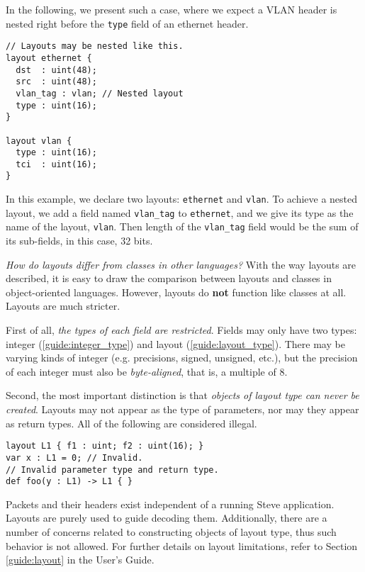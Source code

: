 In the following, we present such a case, where we expect a VLAN header
\cite{vlan_std} is nested right before the \texttt{type} field of an ethernet
header.

\begin{codepage}
\begin{lstlisting}
// Layouts may be nested like this.
layout ethernet {
  dst  : uint(48);
  src  : uint(48);
  vlan_tag : vlan; // Nested layout
  type : uint(16);
}

layout vlan {
  type : uint(16);
  tci  : uint(16);
}
\end{lstlisting}
\end{codepage}

In this example, we declare two layouts: \texttt{ethernet} and \texttt{vlan}. To
achieve a nested layout, we add a field named \texttt{vlan\_tag} to
\texttt{ethernet}, and we give its type as the name of the layout,
\texttt{vlan}. Then length of the \texttt{vlan\_tag} field would be the sum of
its sub-fields, in this case, 32 bits.

\textit{How do layouts differ from classes in other languages?} With the way
layouts are described, it is easy to draw the comparison between layouts and
classes in object-oriented languages. However, layouts do \textbf{not} function
like classes at all. Layouts are much stricter.

First of all, \textit{the types of each field are restricted}. Fields may only
have two types: integer (\ref{guide:integer_type}) and layout
(\ref{guide:layout_type}). There may be varying kinds of integer (e.g.
precisions, signed, unsigned, etc.), but the precision of each integer must also
be \textit{byte-aligned}, that is, a multiple of 8.

Second, the most important distinction is that \textit{objects of layout type
can never be created}. Layouts may not appear as the type of parameters, nor may
they appear as return types. All of the following are considered illegal.

\begin{codepage}
\begin{lstlisting}
layout L1 { f1 : uint; f2 : uint(16); }
var x : L1 = 0; // Invalid.
// Invalid parameter type and return type.
def foo(y : L1) -> L1 { }
\end{lstlisting}
\end{codepage}

Packets and their headers exist independent of a running Steve application.
Layouts are purely used to guide decoding them. Additionally, there are a number
of concerns related to constructing objects of layout type, thus such behavior
is not allowed. For further details on layout limitations, refer to Section
\ref{guide:layout} in the User's Guide.

